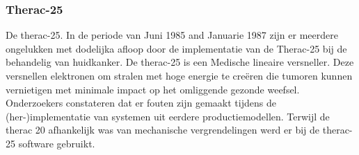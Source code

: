 \documentclass{article}
\begin{document}
	
	\subsubsection{Therac-25}
	\newline \indent De therac-25. In de periode van Juni 1985 and Januarie 1987 zijn er meerdere ongelukken met dodelijka afloop door de implementatie van de Therac-25 bij de behandelig van huidkanker.
	De therac-25 is een Medische lineaire versneller. Deze  versnellen elektronen om stralen met hoge energie te creëren die tumoren kunnen vernietigen met minimale impact op het omliggende gezonde weefsel.
	Onderzoekers constateren dat er fouten zijn gemaakt tijdens de (her-)implementatie van systemen uit eerdere productiemodellen.  
	Terwijl de therac 20 afhankelijk was van mechanische vergrendelingen werd er bij de therac-25 software gebruikt.
	
\end{document}
